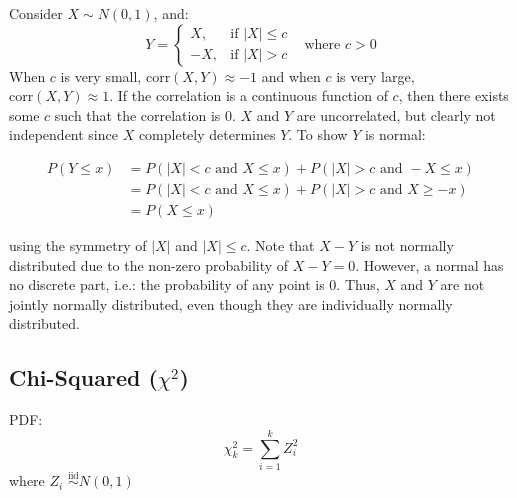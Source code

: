\documentclass[DIV=14,titlepage=false]{scrreprt}
\begin{document}
\begin{example} Consider $X \sim N(0,1)$, and: \[
  Y= 
\begin{cases}
  X,& \text{if } |X| \leq c\\
  -X,& \text{if } |X| > c
\end{cases}
\hspace{10pt}
\text{where $c>0$}
\]
When \( c \) is very small, \( \text{corr}(X, Y) \approx -1\) and when \( c \) is very large, \( \text{corr}(X, Y) \approx 1 \). If the correlation is a continuous function of \( c \), then there exists some \( c \) such that the correlation is \( 0 \). $X$ and $Y$ are uncorrelated, but clearly not independent since $X$ completely determines $Y$. To show $Y$ is normal:

\[
\begin{aligned}
P(Y \leq x) &= P(|X| < c \text{ and } X \leq x) + P(|X| > c \text{ and } -X \leq x) \\
&= P(|X| < c \text{ and } X \leq x) + P(|X| > c \text{ and } X \geq -x) \\
&= P(X \leq x)
\end{aligned}
\]

using the symmetry of \( |X| \) and \(|X| \leq c \). Note that \( X - Y \) is not normally distributed due to the non-zero probability of \( X - Y = 0 \). However, a normal has no discrete part, i.e.: the probability of any point is 0. Thus, \( X \) and \( Y \) are not jointly normally distributed, even though they are individually normally distributed.
\end{example}

\subsection*{Chi-Squared (\(\chi^2\))}
PDF: \[ \displaystyle \chi^2_k = \sum_{i=1}^k Z_i^2 \] where \( Z_i \) $\overset{\mathrm{iid}}{\sim}N(0,1)$
\end{document}

